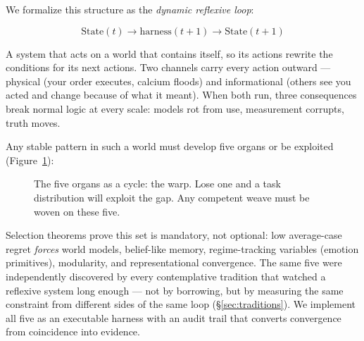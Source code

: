 \documentclass[11pt]{article}
\begin{document}
We formalize this structure as the \emph{dynamic reflexive loop}:

\begin{equation}
\mathrm{State}(t) \to \mathrm{harness}(t{+}1) \to \mathrm{State}(t{+}1)
\end{equation}

A system that acts on a world that contains itself, so its actions rewrite the conditions for its next actions. Two channels carry every action outward --- physical (your order executes, calcium floods) and informational (others see you acted and change because of what it meant). When both run, three consequences break normal logic at every scale: models rot from use, measurement corrupts, truth moves.

Any stable pattern in such a world must develop five organs or be exploited (Figure~\ref{fig:fivecycle}):

\begin{figure}[h]
\centering
{}
\caption{The five organs as a cycle: the warp. Lose one and a task distribution will exploit the gap. Any competent weave must be woven on these five.}
\label{fig:fivecycle}
\end{figure}

Selection theorems \citep{nayebi2026} prove this set is mandatory, not optional: low average-case regret \emph{forces} world models, belief-like memory, regime-tracking variables (emotion primitives), modularity, and representational convergence. The same five were independently discovered by every contemplative tradition that watched a reflexive system long enough --- not by borrowing, but by measuring the same constraint from different sides of the same loop (\S\ref{sec:traditions}). We implement all five as an executable harness with an audit trail that converts convergence from coincidence into evidence.
\end{document}
